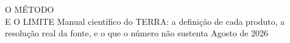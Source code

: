 \documentclass[11pt,a4paper,oneside]{book}
\begin{document}
\frontmatter

%
%
%
\terracapaperiodico
  {O MÉTODO\\E O LIMITE}
  {Manual científico do TERRA: a definição de cada produto, a resolução real da
   fonte, e o que o número não sustenta}
  {Agosto de 2026}

%
%
\tableofcontents
\clearpage


\end{document}
